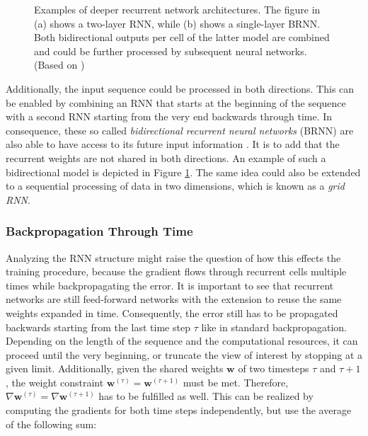 \begin{figure}[htpb]
\begin{subfigure}{0.3\textwidth}
  \caption{}
  \label{fig:rnn-bidirectional}
\end{subfigure}
\caption[Deep Recurrent Network Architectures]{Examples of deeper recurrent network architectures. The figure in (a) shows a two-layer RNN, while (b) shows a single-layer BRNN. Both bidirectional outputs per cell of the latter model are combined and could be further processed by subsequent neural networks. (Based on \parencite{rnn-effectiveness})}
\label{fig:rnn-advanced}
\end{figure}

Additionally, the input sequence could be processed in both directions. This can be enabled by combining an RNN that starts at the beginning of the sequence with a second RNN starting from the very end backwards through time. In consequence, these so called \textit{bidirectional recurrent neural networks} (BRNN) are also able to have access to its future input information \parencite[p. 394ff.]{deep_learning}. It is to add that the recurrent weights are not shared in both directions. An example of such a bidirectional model is depicted in Figure \ref{fig:rnn-bidirectional}. The same idea could also be extended to a sequential processing of data in two dimensions, which is known as a \textit{grid RNN}.

\subsubsection{Backpropagation Through Time}

Analyzing the RNN structure might raise the question of how this effects the training procedure, because the gradient flows through recurrent cells multiple times while backpropagating the error. It is important to see that recurrent networks are still feed-forward networks with the extension to reuse the same weights expanded in time. Consequently, the error still has to be propagated backwards starting from the last time step $ \tau $ like in standard backpropagation. Depending on the length of the sequence and the computational resources, it can proceed until the very beginning, or truncate the view of interest by stopping at a given limit. Additionally, given the shared weights $ \textbf{w} $ of two timesteps $\tau $ and $ \tau+1 $, the weight constraint $ \textbf{w}^{(\tau)} = \textbf{w}^{(\tau+1)} $ must be met. Therefore, $ \nabla \textbf{w}^{(\tau)} = \nabla \textbf{w}^{(\tau+1)} $ has to be fulfilled as well. This can be realized by computing the gradients for both time steps independently, but use the average of the following sum:

